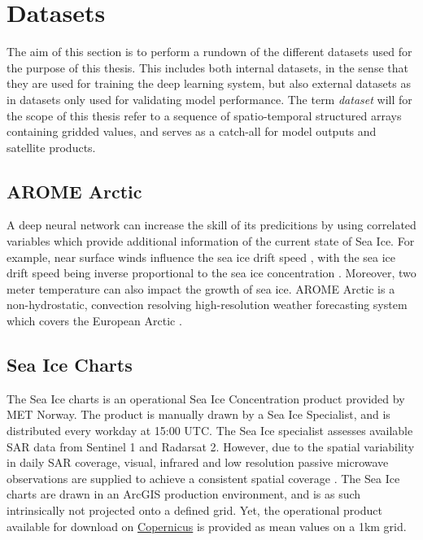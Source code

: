 \documentclass[../main/thesis.tex]{subfiles}
\begin{document}
\section{Datasets}
The aim of this section is to perform a rundown of the different datasets used for the purpose of this thesis. This includes both internal datasets, in the sense that they are used for training the deep learning system, but also external datasets as in datasets only used for validating model performance. The term \textit{dataset} will for the scope of this thesis refer to a sequence of spatio-temporal structured arrays containing gridded values, and serves as a catch-all for model outputs and satellite products. 
 
\subsection{AROME Arctic}
A deep neural network can increase the skill of its predicitions by using correlated variables which provide additional information of the current state of Sea Ice.  For example, near surface winds influence the sea ice drift speed \cite{Spreen2011}, with the sea ice drift speed being inverse proportional to the sea ice concentration \cite{Yu2020}. Moreover, two meter temperature can also impact the growth of sea ice. AROME Arctic is a non-hydrostatic, convection resolving high-resolution weather forecasting system which covers the European Arctic \cite{Mueller2017}.


\subsection{Sea Ice Charts}

The Sea Ice charts is an operational Sea Ice Concentration product provided by MET Norway. The product is manually drawn by a Sea Ice Specialist, and is distributed every workday at 15:00 UTC. The Sea Ice specialist assesses available SAR data from Sentinel 1 and Radarsat 2. However, due to the spatial variability in daily SAR coverage, visual, infrared and low resolution passive microwave observations are supplied to achieve a consistent spatial coverage \cite{MOI2015}. The Sea Ice charts are drawn in an ArcGIS production environment, and is as such intrinsically not projected onto a defined grid. Yet, the operational product available for download on \href{https://resources.marine.copernicus.eu/product-detail/SEAICE_ARC_SEAICE_L4_NRT_OBSERVATIONS_011_002/INFORMATION}{Copernicus} is provided as mean values on a 1km grid.
\end{document}
